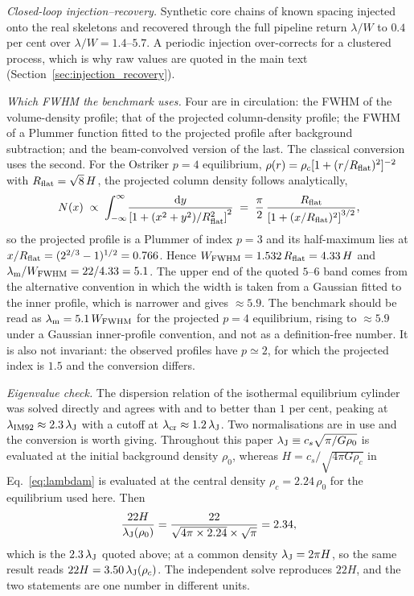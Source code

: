 \documentclass[usenatbib,twoside,twocolumn]{mnras}
\begin{document}
\emph{Closed-loop injection--recovery.} Synthetic core chains of known spacing injected onto the real skeletons and recovered through the full pipeline return $\lambda/W$ to $0.4$ per cent over $\lambda/W=1.4$--$5.7$. A periodic injection over-corrects for a clustered process, which is why raw values are quoted in the main text (Section~\ref{sec:injection_recovery}).

\emph{Which FWHM the benchmark uses.} Four are in circulation: the FWHM of the volume-density profile; that of the projected column-density profile; the FWHM of a Plummer function fitted to the projected profile after background subtraction; and the beam-convolved version of the last. The classical conversion uses the second. For the Ostriker $p=4$ equilibrium, $\rho(r)=\rho_c[1+(r/R_{\rm flat})^2]^{-2}$ with $R_{\rm flat}=\sqrt8\,H$, the projected column density follows analytically,
\begin{equation}
N(x)\;\propto\;\int_{-\infty}^{\infty}\!\frac{{\rm d}y}{\left[1+(x^2+y^2)/R_{\rm flat}^2\right]^{2}}\;=\;\frac{\pi}{2}\,\frac{R_{\rm flat}}{\left[1+(x/R_{\rm flat})^{2}\right]^{3/2}},
\label{eq:ostrikercol}
\end{equation}
so the projected profile is a Plummer of index $p=3$ and its half-maximum lies at $x/R_{\rm flat}=(2^{2/3}-1)^{1/2}=0.766$. Hence $W_{\rm FWHM}=1.532\,R_{\rm flat}=4.33\,H$ and $\lambda_{\rm m}/W_{\rm FWHM}=22/4.33=5.1$. The upper end of the quoted $5$--$6$ band comes from the alternative convention in which the width is taken from a Gaussian fitted to the inner profile, which is narrower and gives $\approx5.9$. The benchmark should be read as $\lambda_{\rm m}=5.1\,W_{\rm FWHM}$ for the projected $p=4$ equilibrium, rising to $\approx5.9$ under a Gaussian inner-profile convention, and not as a definition-free number. It is also not invariant: the observed profiles have $p\simeq2$, for which the projected index is $1.5$ and the conversion differs.

\emph{Eigenvalue check.} The dispersion relation of the isothermal equilibrium cylinder was solved directly and agrees with \citet{Nagasawa1987} and \citet{Fischera2012} to better than $1$ per cent, peaking at $\lambda_{\rm IM92}\approx2.3\,\lambda_{\rm J}$ with a cutoff at $\lambda_{\rm cr}\approx1.2\,\lambda_{\rm J}$. Two normalisations are in use and the conversion is worth giving. Throughout this paper $\lambda_{\rm J}\equiv c_s\sqrt{\pi/G\rho_0}$ is evaluated at the initial background density $\rho_0$, whereas $H=c_s/\sqrt{4\pi G\rho_c}$ in Eq.~\ref{eq:lambdam} is evaluated at the central density $\rho_c=2.24\,\rho_0$ for the equilibrium used here. Then
\begin{equation}
\frac{22H}{\lambda_{\rm J}(\rho_0)}=\frac{22}{\sqrt{4\pi\times2.24}\times\sqrt{\pi}}=2.34,
\label{eq:hconv}
\end{equation}
which is the $2.3\,\lambda_{\rm J}$ quoted above; at a common density $\lambda_{\rm J}=2\pi H$, so the same result reads $22H=3.50\,\lambda_{\rm J}(\rho_c)$. The independent solve reproduces $22H$, and the two statements are one number in different units.
\end{document}
